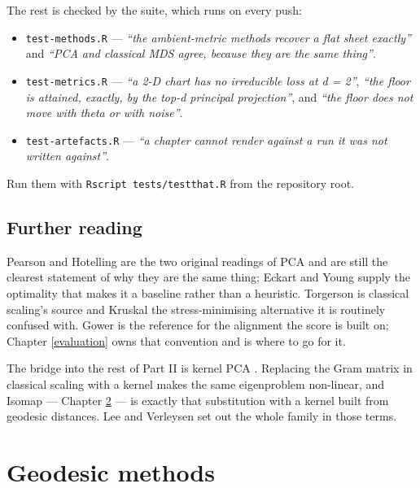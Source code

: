 \documentclass[
  british,
  a4paper,
]{book}
\providecommand{\tightlist}{%
  \setlength{\itemsep}{0pt}\setlength{\parskip}{0pt}}
\begin{document}
The rest is checked by the suite, which runs on every push:

\begin{itemize}
\tightlist
\item
  \texttt{test-methods.R} --- \emph{``the ambient-metric methods recover a flat sheet exactly''}
  and \emph{``PCA and classical MDS agree, because they are the same thing''}.
\item
  \texttt{test-metrics.R} --- \emph{``a 2-D chart has no irreducible loss at d = 2''}, \emph{``the
  floor is attained, exactly, by the top-d principal projection''}, and \emph{``the
  floor does not move with theta or with noise''}.
\item
  \texttt{test-artefacts.R} --- \emph{``a chapter cannot render against a run it was not written
  against''}.
\end{itemize}

Run them with \texttt{Rscript\ tests/testthat.R} from the repository root.

\section{Further reading}\label{lin-reading}

Pearson \citep{pearson1901lines} and Hotelling \citep{hotelling1933components} are the two
original readings of PCA and are still the clearest statement of why they are the
same thing; Eckart and Young \citep{eckart1936approximation} supply the optimality
that makes it a baseline rather than a heuristic. Torgerson
\citep{torgerson1952mds} is classical scaling's source and Kruskal \citep{kruskal1964fit}
the stress-minimising alternative it is routinely confused with. Gower
\citep{gower1975procrustes} is the reference for the alignment the score is built on;
Chapter \ref{evaluation} owns that convention and is where to go for it.

The bridge into the rest of Part II is kernel PCA \citep{scholkopf1998kernelpca}.
Replacing the Gram matrix in classical scaling with a kernel makes the same
eigenproblem non-linear, and Isomap --- Chapter \ref{geodesic} --- is exactly that
substitution with a kernel built from geodesic distances. Lee and Verleysen
\citep{lee2007nonlinear} set out the whole family in those terms.

\chapter{Geodesic methods}\label{geodesic}
\end{document}
